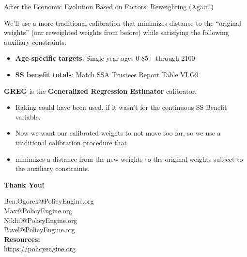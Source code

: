 \documentclass[11pt,aspectratio=169]{beamer}
\begin{document}
\begin{frame}{After the Economic Evolution Based on Factors: Reweighting (Again!)}

  We'll use a more traditional calibration that minimizes distance to the ``original weights'' (our reweighted weights from before) while satisfying the following auxiliary constraints: 

\small
\begin{itemize}
    \item \textbf{Age-specific targets}: Single-year ages 0-85+ through 2100
    \item \textbf{SS benefit totals}: Match SSA Trustees Report Table VI.G9
\end{itemize}

  \textbf{GREG} is the \textbf{Generalized Regression Estimator} calibrator.

\begin{itemize}
   \item Raking could have been used, if it wasn't for the continuous SS Benefit variable.
   \item Now we want our calibrated weights to not move too far, so we use a traditional calibration procedure that
   \item minimizes a distance from the new weights to the original weights subject to the auxiliary constraints.
\end{itemize}
\end{frame}

\begin{frame}
\begin{center}
\Large{\textbf{Thank You!}}

\vspace{0.5cm}
Ben.Ogorek@PolicyEngine.org \\
Max@PolicyEngine.org \\
Nikhil@PolicyEngine.org \\
Pavel@PolicyEngine.org \\
\vspace{0.5cm}
\textbf{Resources:}\\
\url{https://policyengine.org}
\end{center}
\end{frame}
\end{document}
